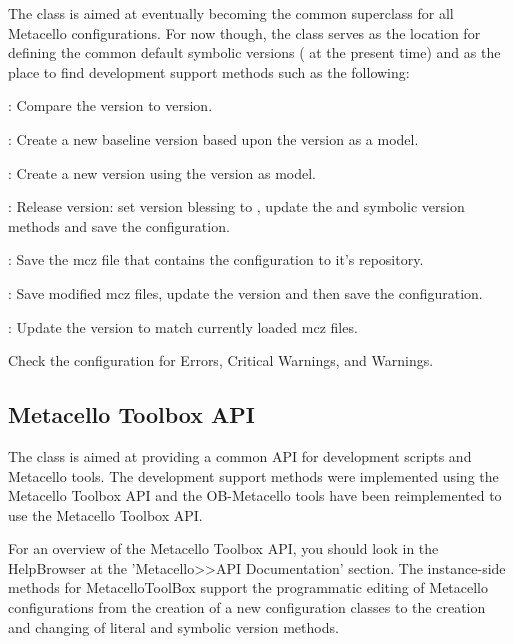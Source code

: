 \documentclass[a4paper,10pt,twoside]{book}
\begin{document}
\begin{code}{}
\begin{code}{}
The  class is aimed at eventually becoming the common superclass for all Metacello configurations. For now though, the class serves as the location for defining the common default symbolic versions ( at the present time) and as the place to find development support methods such as the following:

\begin{description}
\item {}: Compare the  version to  version.
\item {}: Create a new baseline version based upon the  version as a model.
\item {}: Create a new  version using the  version as model.
\item {}: Release  version: set version blessing to , update the  and  symbolic version methods and save the configuration.

\item {}: Save the mcz file that contains the configuration to it's repository.

\item {}: Save modified mcz files, update the  version and then save the configuration.

\item {}: Update the  version to match currently loaded mcz files.

\item {} Check the configuration for Errors, Critical Warnings, and Warnings.
\end{description}

\subsection{Metacello Toolbox API}

The  class is aimed at providing a common API for development scripts and Metacello tools. The development support methods were implemented using the Metacello Toolbox API and the OB-Metacello tools have been reimplemented to use the Metacello Toolbox API.

For an overview of the Metacello Toolbox API, you should look in the HelpBrowser at the 'Metacello>>API Documentation' section. The instance-side methods for MetacelloToolBox support the  programmatic editing of Metacello configurations from the creation of a new configuration classes to the creation and changing of literal and symbolic version methods.


\end{code}
\end{code}
\end{document}
